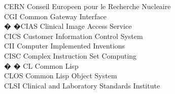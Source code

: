 \begin{tabbing}


    \>CERN \>\>Conseil Europeen pour le Recherche Nucleaire\\



    \>CGI \>\>Common Gateway Interface\\





 � �\>CIAS \>\>Clinical Image Access Service\\

    \>CICS \>\>Customer Information Control System\\

    \>CII \>\>Computer Implemented Inventions\\


    \>CISC \>\>Complex Instruction Set Computing\\

� � \>CL \>\>Common Lisp\\




    \>CLOS \>\>Common Lisp Object System\\

    \>CLSI \>\>Clinical and Laboratory Standards Institute\\


\end{tabbing}
